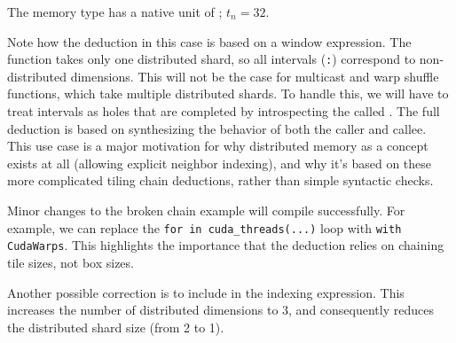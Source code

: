 \filbreak
{}



\filbreak
{}



\filbreak
{}



\filbreak
{}

The  memory type has a native unit of ; $t_n = 32$.



Note how the deduction in this case is based on a window expression.
The  function takes only one distributed shard, so all intervals (\texttt{:}) correspond to non-distributed dimensions.
This will not be the case for multicast and warp shuffle functions, which take multiple distributed shards.
To handle this, we will have to treat intervals as holes that are completed by introspecting the called .
The full deduction is based on synthesizing the behavior of both the caller and callee.
This use case is a major motivation for why distributed memory as a concept exists at all (allowing explicit neighbor indexing), and why it's based on these more complicated tiling chain deductions, rather than simple syntactic checks.

\filbreak
{}



\filbreak
{}

Minor changes to the broken chain example will compile successfully.
For example, we can replace the \texttt{for  in cuda\_threads(...)} loop with \texttt{with CudaWarps}.
This highlights the importance that the deduction relies on chaining tile sizes, not box sizes.



Another possible correction is to include \texttt{} in the indexing expression.
This increases the number of distributed dimensions to 3, and consequently reduces the distributed shard size (from 2 to 1).

